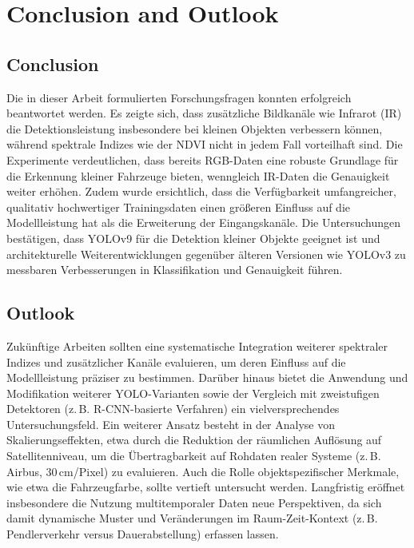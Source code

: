 \chapter{Conclusion and Outlook}
\label{ch:conclusion}

\section{Conclusion}
Die in dieser Arbeit formulierten Forschungsfragen konnten erfolgreich beantwortet werden. 
Es zeigte sich, dass zusätzliche Bildkanäle wie Infrarot (IR) die Detektionsleistung insbesondere bei kleinen Objekten verbessern können, während spektrale Indizes wie der NDVI nicht in jedem Fall vorteilhaft sind. 
Die Experimente verdeutlichen, dass bereits RGB-Daten eine robuste Grundlage für die Erkennung kleiner Fahrzeuge bieten, wenngleich IR-Daten die Genauigkeit weiter erhöhen. 
Zudem wurde ersichtlich, dass die Verfügbarkeit umfangreicher, qualitativ hochwertiger Trainingsdaten einen größeren Einfluss auf die Modellleistung hat als die Erweiterung der Eingangskanäle. 
Die Untersuchungen bestätigen, dass \acrshort{YOLO}v9 für die Detektion kleiner Objekte geeignet ist und architekturelle Weiterentwicklungen gegenüber älteren Versionen wie \acrshort{YOLO}v3 zu messbaren Verbesserungen in Klassifikation und Genauigkeit führen.

\section{Outlook}
Zukünftige Arbeiten sollten eine systematische Integration weiterer spektraler Indizes und zusätzlicher Kanäle evaluieren, um deren Einfluss auf die Modellleistung präziser zu bestimmen. 
Darüber hinaus bietet die Anwendung und Modifikation weiterer \acrshort{YOLO}-Varianten sowie der Vergleich mit zweistufigen Detektoren (z.\,B. \textsc{R-CNN}-basierte Verfahren) ein vielversprechendes Untersuchungsfeld. 
Ein weiterer Ansatz besteht in der Analyse von Skalierungseffekten, etwa durch die Reduktion der räumlichen Auflösung auf Satellitenniveau, um die Übertragbarkeit auf Rohdaten realer Systeme (z.\,B. Airbus, 30\,cm/Pixel) zu evaluieren. 
Auch die Rolle objektspezifischer Merkmale, wie etwa die Fahrzeugfarbe, sollte vertieft untersucht werden. 
Langfristig eröffnet insbesondere die Nutzung multitemporaler Daten neue Perspektiven, da sich damit dynamische Muster und Veränderungen im Raum-Zeit-Kontext (z.\,B. Pendlerverkehr versus Dauerabstellung) erfassen lassen.

